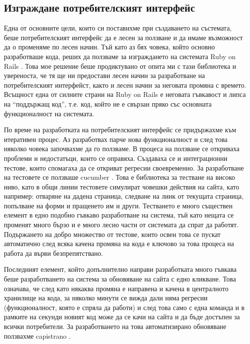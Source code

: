 \documentclass[a4paper,12pt]{article}
\begin{document}
  \subsection{Изграждане потребителският интерфейс}
    Една от основните цели, които си поставихме при създаването на състемата, беше потребителският интерфейс да е лесен за ползване и да имаме възможност да о променяме по лесен начин. Тъй като аз бях човека, който основно разработваше кода, реших да ползваме за изграждането на системата Ruby on Rails \cite{rubyonrails_site}. Това мое решение беше продиктувано от опита ми с тази библиотека и увереноста, че тя ще ни предостави лесен начин за разработване на потребителският интерфейст, както и лесен начин за неговата промяна с времето. Всъщност една от силните страни на Ruby on Rails е неговата гъвкавост и липса на ``поддържащ код'', т.е. код, който не е свързан пряко със основната функционалност на системата.
    
    По време на разработката на потребителският интерфейс се придържахме към итеративен процес. Аз разработвах парче нова функционалност и след това няколко човека започвахме да го ползваме. В процеса на ползване се откриваха проблеми и недостатъци, които се оправяха. Създаваха се и интеграционни тестове, които спомагаха да се откриват регресии своевременно. За разработване на тестовете се ползваше cucumber \cite{cucumber_site}. Това е библиотека за тестване на високо ниво, като в общи линии тестовете симулират човешки действия на сайта, като например: отваряне на дадена страница, следване на линк от текущата страница, попълване на форми и пращенето им и други. Тестването е много съществен елемент в едно подобно гъвкаво разработване на система, тъй като нещата се променят много бързо и е много лесно части от системата да спрат да работят. Подържането на добро множество от тестове, които освен това се пускат автоматично след всяка качена промяна на кода е ключово за това процеса на работа да върви безпрепятствано.
    
    Последният елемент, който допълнително направи разработката много гъвкава беше разработването на система за обновяване на сайта с едно кликване. Това означава, че след като някаква промяна е направена и качена в централното хранилище на кода, за няколко минути се вижда дали няма регресии (функционалност, която е спряла да работи) и след това само с една команда и в рамките на секунди новият код може да се качи на сайта и да бъде достъпен за всички потребители. За разработването на това автоматизирано обновяване ползвахме capistrano \cite{capistrano_site}.
    
\end{document}
